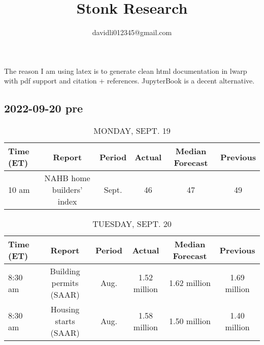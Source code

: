 \documentclass{book}
\title{Stonk Research}
\author{davidli012345@gmail.com}
\begin{document}
\maketitle                      %


 The reason I am using latex is to generate clean html documentation in lwarp with pdf support and citation + references. JupyterBook is a decent alternative.

\tableofcontents                %
\listoffigures


  \subsection{ 2022-09-20 pre }
  \normalsize%
  
  
  \begin{table}[htbp]%
  \caption{MONDAY, SEPT. 19}%
  \centering%
  \begin{adjustbox}{width=1\textwidth}%
  \begin{tabular}{lccccc}
  \toprule
  Time (ET) &                    Report & Period & Actual & Median Forecast & Previous \\
  \midrule
      10 am & NAHB home builders' index &  Sept. &     46 &              47 &       49 \\
  \bottomrule
  \end{tabular}
  \end{adjustbox}%
  \end{table}
  
  
  
  \begin{table}[htbp]%
  \caption{TUESDAY, SEPT. 20}%
  \centering%
  \begin{adjustbox}{width=1\textwidth}%
  \begin{tabular}{lccccc}
  \toprule
  Time (ET) &                  Report & Period &       Actual & Median Forecast &     Previous \\
  \midrule
    8:30 am & Building permits (SAAR) &   Aug. & 1.52 million &    1.62 million & 1.69 million \\
    8:30 am &   Housing starts (SAAR) &   Aug. & 1.58 million &    1.50 million & 1.40 million \\
  \bottomrule
  \end{tabular}
  \end{adjustbox}%
  \end{table}
  
\end{document}
